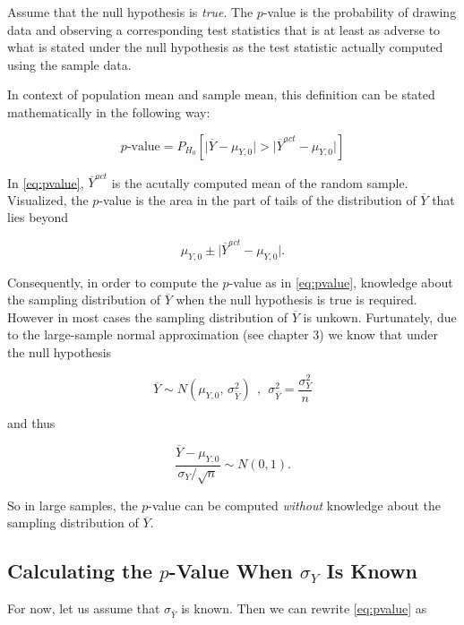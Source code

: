 \documentclass[]{book}
\theoremstyle{definition}
\theoremstyle{definition}
\theoremstyle{definition}
\theoremstyle{remark}
\begin{document}
Assume that the null hypothesis is \emph{true}. The \(p\)-value is the
probability of drawing data and observing a corresponding test
statistics that is at least as adverse to what is stated under the null
hypothesis as the test statistic actually computed using the sample
data.

In context of population mean and sample mean, this definition can be
stated mathematically in the following way:

\begin{equation}
p \text{-value} = P_{H_0}\left[ \lvert \overline{Y} - \mu_{Y,0} \rvert > \lvert \overline{Y}^{act} - \mu_{Y,0} \rvert \right] \label{eq:pvalue}
\end{equation}

In \eqref{eq:pvalue}, \(\overline{Y}^{act}\) is the acutally computed mean
of the random sample. Visualized, the \(p\)-value is the area in the
part of tails of the distribution of \(\overline{Y}\) that lies beyond

\[ \mu_{Y,0} \pm \lvert \overline{Y}^{act} - \mu_{Y,0} \rvert. \]

Consequently, in order to compute the \(p\)-value as in \eqref{eq:pvalue},
knowledge about the sampling distribution of \(\overline{Y}\) when the
null hypothesis is true is required. However in most cases the sampling
distribution of \(\overline{Y}\) is unkown. Furtunately, due to the
large-sample normal approximation (see chapter 3) we know that under the
null hypothesis

\[ \overline{Y} \sim N(\mu_{Y,0}, \, \sigma^2_{\overline{Y}}) \ \ , \ \ \sigma^2_{\overline{Y}} = \frac{\sigma_Y^2}{n} \]

and thus

\[ \frac{\overline{Y} - \mu_{Y,0}}{\sigma_Y/\sqrt{n}} \sim N(0,1). \]

So in large samples, the \(p\)-value can be computed \emph{without}
knowledge about the sampling distribution of \(\overline{Y}\).

\subsection*{\texorpdfstring{Calculating the \(p\)-Value When
\(\sigma_Y\) Is
Known}{Calculating the p-Value When \textbackslash{}sigma\_Y Is Known}}\label{calculating-the-p-value-when-sigma_y-is-known}

For now, let us assume that \(\sigma_{\overline{Y}}\) is known. Then we
can rewrite \eqref{eq:pvalue} as
\end{document}
